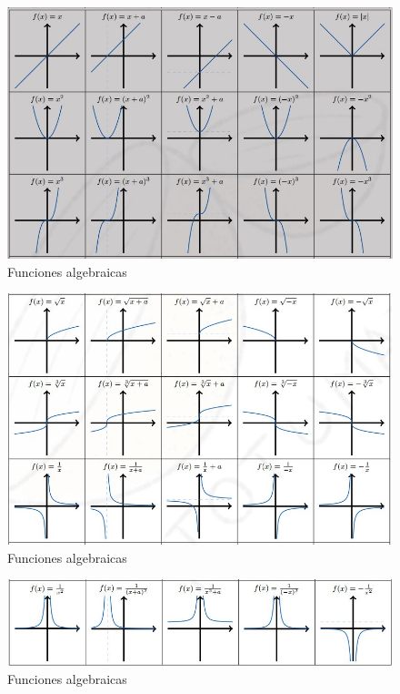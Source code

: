 \documentclass[10pt,twoside]{SelfArx} %
\begin{document}
\begin{figure}[h]
	\centering
	\includegraphics[width=15cm]{funciones_1}
	\caption{Funciones algebraicas}
	\label{funciones algebraicas1}
	
\end{figure}
	
	\begin{figure}[h]
	\centering
	\includegraphics[width=15cm]{funciones_2}
	\caption{Funciones algebraicas}
	\label{funciones algebraicas2}
	\end{figure}
	\begin{figure}[h]
	\centering
	\includegraphics[width=15cm]{funciones_3}
	\caption{Funciones algebraicas}
	\label{funciones algebraicas3}
	\end{figure}
	
\end{document}
